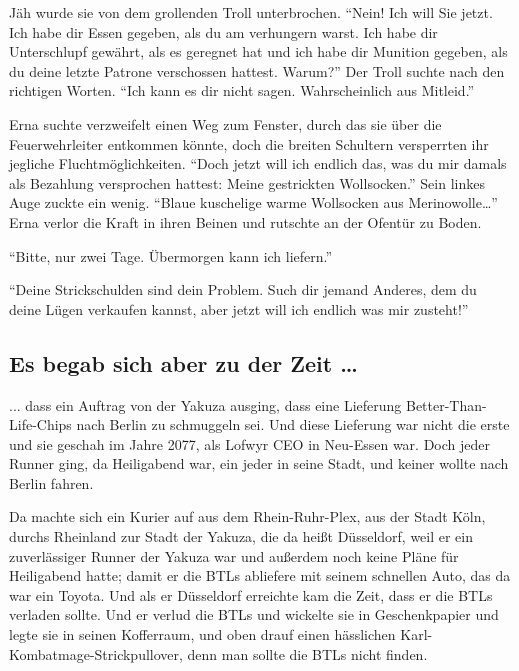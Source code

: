 Jäh wurde sie von dem grollenden Troll unterbrochen.
\enquote{Nein! Ich will Sie jetzt. Ich habe dir Essen gegeben, als du am verhungern warst. Ich habe dir Unterschlupf gewährt, als es geregnet hat und ich habe dir Munition gegeben, als du deine letzte Patrone verschossen hattest. Warum?} Der Troll suchte nach den richtigen Worten. \enquote{Ich kann es dir nicht sagen. Wahrscheinlich aus Mitleid.}

Erna suchte verzweifelt einen Weg zum Fenster, durch das sie über die Feuerwehrleiter entkommen könnte, doch die breiten Schultern versperrten ihr jegliche Fluchtmöglichkeiten.
\enquote{Doch jetzt will ich endlich das, was du mir damals als Bezahlung versprochen hattest: Meine gestrickten Wollsocken.} Sein linkes Auge zuckte ein wenig. \enquote{Blaue kuschelige warme Wollsocken aus Merinowolle\dots}
Erna verlor die Kraft in ihren Beinen und rutschte an der Ofentür zu Boden.

\enquote{Bitte, nur zwei Tage. Übermorgen kann ich liefern.}

\enquote{Deine Strickschulden sind dein Problem. Such dir jemand Anderes, dem du deine Lügen verkaufen kannst, aber jetzt will ich endlich was mir zusteht!}

\subsection{Es begab sich aber zu der Zeit …}
... dass ein Auftrag von der Yakuza ausging, dass eine Lieferung Better-Than-Life-Chips nach Berlin zu schmuggeln sei.
Und diese Lieferung war nicht die erste und sie geschah im Jahre 2077, als Lofwyr CEO in Neu-Essen war.
Doch jeder Runner ging, da Heiligabend war, ein jeder in seine Stadt, und keiner wollte nach Berlin fahren.

Da machte sich ein Kurier auf aus dem Rhein-Ruhr-Plex, aus der Stadt Köln, durchs Rheinland zur Stadt der Yakuza, die da heißt Düsseldorf, weil er ein zuverlässiger Runner der Yakuza war und außerdem noch keine Pläne für Heiligabend hatte; damit er die BTLs abliefere mit seinem schnellen Auto, das da war ein Toyota.
Und als er Düsseldorf erreichte kam die Zeit, dass er die BTLs verladen sollte.
Und er verlud die BTLs und wickelte sie in Geschenkpapier und legte sie in seinen Kofferraum, und oben drauf einen hässlichen Karl-Kombatmage-Strickpullover, denn man sollte die BTLs nicht finden.

